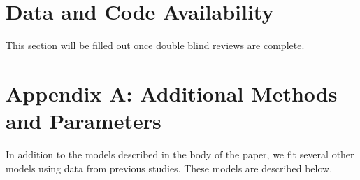 \documentclass[11pt]{article}
\begin{document}

\section*{Data and Code Availability}
This section will be filled out once double blind reviews are complete. 


\renewcommand{\theequation}{A\arabic{equation}}
\renewcommand{\thetable}{A\arabic{table}}
\setcounter{equation}{0}  %
\setcounter{figure}{0}
\setcounter{table}{0}

%
%




\newpage{}


\appendix
\label{appendix}
\section*{Appendix A: Additional Methods and Parameters} \label{appendix:A}
In addition to the models described in the body of the paper, we fit several other models using data from previous studies.
These models are described below.
\end{document}
